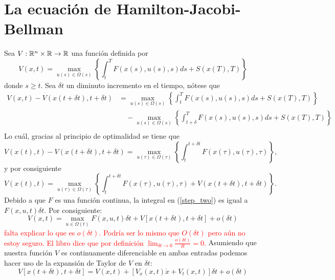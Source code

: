 \section{La ecuación de Hamilton-Jacobi-Bellman}
Sea $V: \mathbb R^n \times \mathbb R \to \mathbb R$ una función definida por
\begin{equation}
    \label{value_function}
    V(x,t) = \max_{u(s)\in \Omega(s)}\left\{\int_t^T F(x(s), u(s), s)ds + S(x(T), T)\right\}
\end{equation}
donde $s \geq t$.
Sea $\delta t$ un diminuto incremento en el tiempo, nótese que 
\begin{align*}
    V(x,t) - V(x(t + \delta t), t + \delta t) &= \max_{u(s)\in \Omega(s)}\left\{\int_t^T F(x(s), u(s), s)ds + S(x(T), T)\right\}  \\
    & \quad - \max_{u(s)\in \Omega(s)}\left\{\int_{t+ \delta}^T F(x(s), u(s), s)ds + S(x(T), T)\right\} \\
\end{align*}
Lo cuál, gracias al principio de optimalidad \cite{optimal_principle} se tiene que 
\begin{equation}
    \label{step_one}
   V(x(t), t) - V(x(t + \delta t), t + \delta t) = \max_{u(\tau)\in \Omega(\tau)} \left\{ \int_{t}^{t+ \delta t} F(x(\tau), u(\tau), \tau)\right\},
\end{equation} 
y por consiguiente
\begin{equation}
    \label{step_two}
    V(x(t), t) = \max_{u(\tau)\in \Omega(\tau)} \left\{ \int_{t}^{t+ \delta t} F(x(\tau), u(\tau), \tau) + V(x(t + \delta t), t + \delta t)\right\}.
 \end{equation} 
 Debido a que $F$ es una función continua, la integral en (\ref{step_two}) es igual a $F(x,u,t)\delta t$. Por consiguiente:
 \begin{equation}
    \label{2.11}
     V(x,t) = \max_{u\in \Omega(t)} F(x,u,t)\delta t + V[x(t+\delta t), t + \delta t] + o(\delta t)
 \end{equation} 
 \textcolor{red}{falta explicar lo que es $o(\delta t)$. Podría ser lo mismo que $O(\delta t)$ pero aún no estoy seguro. El libro dice que por definición $\lim_{\delta t \to 0} \frac{o(\delta t)}{\delta t} = 0$.}
 Asumiendo que nuestra función $V$ es continuamente diferenciable en ambas entradas podemos hacer uso de la expansión de Taylor de $V$ en $\delta t$:
 \begin{equation}
    V[x(t + \delta t), t + \delta t] = V(x,t) + [V_x(x,t)\dot x + V_t(x,t)]\delta t + o(\delta t)
 \end{equation}
